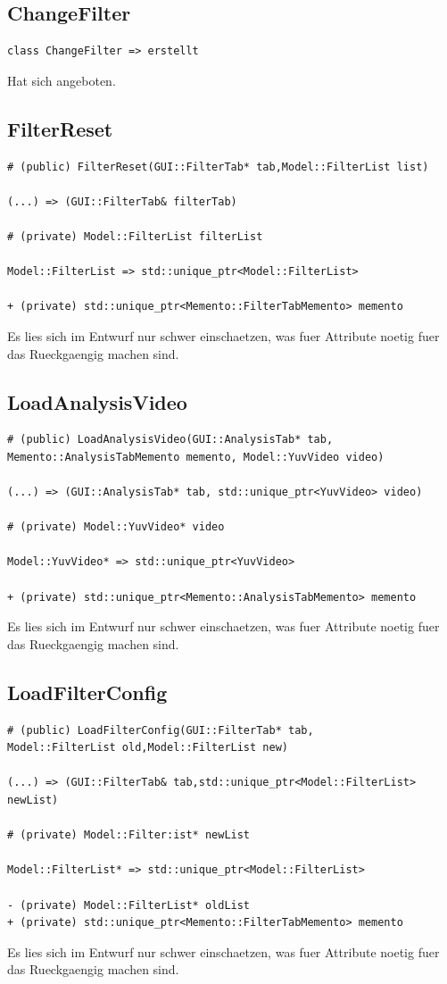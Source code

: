 \documentclass[parskip=full]{scrartcl}
\begin{document}
\subsection{ChangeFilter}
\begin{verbatim}
class ChangeFilter => erstellt
\end{verbatim}
Hat sich angeboten.
\subsection{FilterReset}
\begin{verbatim}
# (public) FilterReset(GUI::FilterTab* tab,Model::FilterList list)

(...) => (GUI::FilterTab& filterTab)

# (private) Model::FilterList filterList

Model::FilterList => std::unique_ptr<Model::FilterList>

+ (private) std::unique_ptr<Memento::FilterTabMemento> memento
\end{verbatim}
Es lies sich im Entwurf nur schwer einschaetzen, was fuer Attribute noetig fuer das Rueckgaengig machen sind. 
\subsection{LoadAnalysisVideo}
\begin{verbatim}
# (public) LoadAnalysisVideo(GUI::AnalysisTab* tab, 
Memento::AnalysisTabMemento memento, Model::YuvVideo video)

(...) => (GUI::AnalysisTab* tab, std::unique_ptr<YuvVideo> video)

# (private) Model::YuvVideo* video

Model::YuvVideo* => std::unique_ptr<YuvVideo>

+ (private) std::unique_ptr<Memento::AnalysisTabMemento> memento
\end{verbatim}
Es lies sich im Entwurf nur schwer einschaetzen, was fuer Attribute noetig fuer das Rueckgaengig machen sind. 
\subsection{LoadFilterConfig}
\begin{verbatim}
# (public) LoadFilterConfig(GUI::FilterTab* tab,
Model::FilterList old,Model::FilterList new)

(...) => (GUI::FilterTab& tab,std::unique_ptr<Model::FilterList> newList)

# (private) Model::Filter:ist* newList

Model::FilterList* => std::unique_ptr<Model::FilterList>

- (private) Model::FilterList* oldList
+ (private) std::unique_ptr<Memento::FilterTabMemento> memento
\end{verbatim}
Es lies sich im Entwurf nur schwer einschaetzen, was fuer Attribute noetig fuer das Rueckgaengig machen sind.
\end{document}
